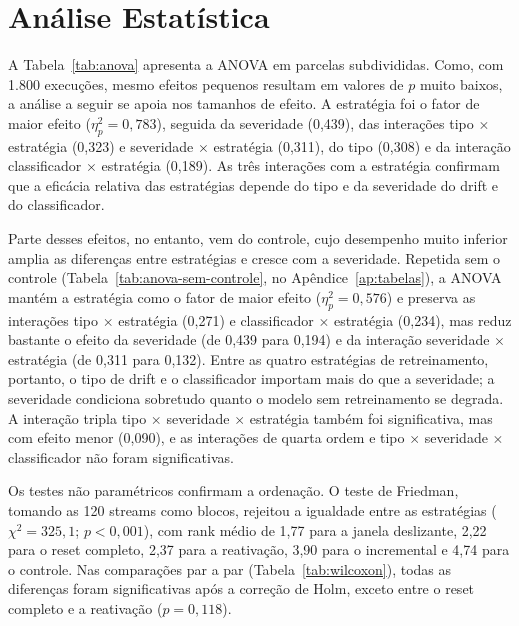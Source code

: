 \section{Análise Estatística}
\label{sec:res_estatistica}

A Tabela~\ref{tab:anova} apresenta a ANOVA em parcelas subdivididas. Como,
com 1.800 execuções, mesmo efeitos pequenos resultam em valores de $p$ muito
baixos, a análise a seguir se apoia nos tamanhos de efeito. A
estratégia foi o fator de maior efeito ($\eta^2_p = 0{,}783$), seguida da
severidade (0,439), das interações tipo $\times$ estratégia (0,323) e
severidade $\times$ estratégia (0,311), do tipo (0,308) e da interação
classificador $\times$ estratégia (0,189). As três interações com a
estratégia confirmam que a eficácia relativa das estratégias depende do tipo
e da severidade do drift e do classificador.

Parte desses efeitos, no entanto, vem do controle, cujo desempenho muito
inferior amplia as diferenças entre estratégias e cresce com a severidade.
Repetida sem o controle (Tabela~\ref{tab:anova-sem-controle}, no
Apêndice~\ref{ap:tabelas}), a ANOVA mantém a estratégia como o fator de
maior efeito ($\eta^2_p = 0{,}576$) e preserva as interações tipo $\times$
estratégia (0,271) e classificador $\times$ estratégia (0,234), mas reduz
bastante o efeito da severidade (de 0,439 para 0,194) e da interação
severidade $\times$ estratégia (de 0,311 para 0,132). Entre as quatro
estratégias de retreinamento, portanto, o tipo de drift e o classificador
importam mais do que a severidade; a severidade condiciona sobretudo quanto
o modelo sem retreinamento se degrada. A interação tripla tipo
$\times$ severidade $\times$ estratégia também foi significativa, mas com
efeito menor (0,090), e as interações de quarta ordem e tipo $\times$
severidade $\times$ classificador não foram significativas.



Os testes não paramétricos confirmam a ordenação. O teste de Friedman,
tomando as 120 streams como blocos, rejeitou a igualdade entre as
estratégias ($\chi^2 = 325{,}1$; $p < 0{,}001$), com rank médio de 1,77 para
a janela deslizante, 2,22 para o reset completo, 2,37 para a reativação,
3,90 para o incremental e 4,74 para o controle. Nas comparações par a par
(Tabela~\ref{tab:wilcoxon}), todas as diferenças foram significativas após a
correção de Holm, exceto entre o reset completo e a reativação ($p = 0{,}118$).



